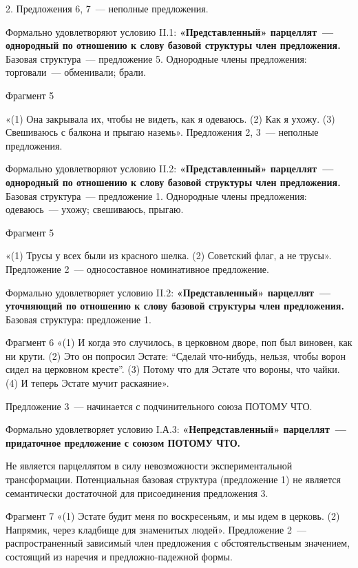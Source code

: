 \documentclass{kursa4}
\begin{document}
{      {2. Предложения 6, 7~--- неполные предложения.}

      {Формально
      }{удовлетворяют}{
      }{условию II.1}{:
      }\textbf{{«Представленный» парцеллят~--- однородный по отношению к слову базовой структуры член предложения.
      }}{Базовая структура~--- предложение 5. Однородные члены предложения: торговали~--- обменивали; брали.}

      {Фрагмент 5}

      «(1) Она закрывала их, чтобы не видеть, как я одеваюсь. (2) Как я ухожу. (3) Свешиваюсь с балкона и прыгаю наземь». Предложения 2, 3~--- неполные предложения. 

      {Формально
      }{удовлетворяют}{
      }{условию }{II.2}{:
      }\textbf{{«Представленный» парцеллят~--- однородный по отношению к слову базовой структуры член предложения.
      }}{Базовая структура~--- предложение
      }{1}{. Однородные члены предложения: }{одеваюсь~--- ухожу; свешиваюсь, прыгаю.}

      {Фрагмент 5}

     «(1) Трусы у всех были из красного шелка. (2) Советский флаг, а не трусы». Предложение 2~--- односоставное номинативное предложение. 

     Формально удовлетворяет условию II.2: \textbf{«Представленный» парцеллят~--- уточняющий по отношению к слову базовой структуры член предложения. }Базовая структура: предложение 1. 

     Фрагмент 6 «(1) И когда это случилось, в церковном дворе, поп был виновен, как ни крути. (2) Это он попросил Эстате: “Сделай что-нибудь, нельзя, чтобы ворон сидел на церковном кресте”. (3) Потому что для Эстате что вороны, что чайки. (4) И теперь Эстате мучит раскаяние». 

     Предложение 3~--- начинается с подчинительного союза ПОТОМУ ЧТО. 

     Формально удовлетворяет условию I.А.3: \textbf{«Непредставленный» парцеллят~--- придаточное предложение с союзом ПОТОМУ ЧТО.} 

     Не является парцеллятом в силу невозможности экспериментальной трансформации. Потенциальная базовая структура (предложение 1) не является семантически достаточной для присоединения предложения 3. 

     Фрагмент 7 «(1) Эстате будит меня по воскресеньям, и мы идем в церковь. (2) Напрямик, через кладбище для знаменитых людей». Предложение 2~--- распространенный зависимый член предложения с обстоятельственым значением, состоящий из наречия и предложно-падежной формы. 

}
\end{document}
